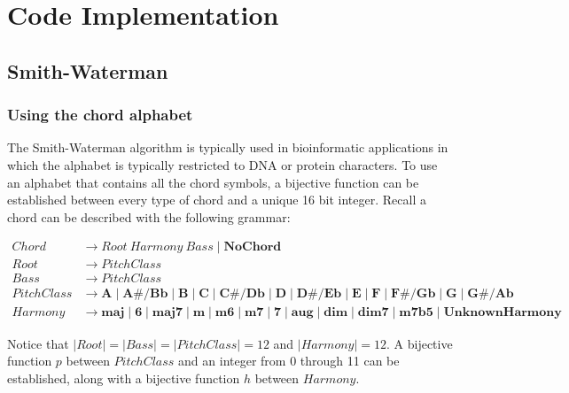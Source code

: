 \chapter{Code Implementation}

\section{Smith-Waterman}

\subsection{Using the chord alphabet}

The Smith-Waterman algorithm is typically used in bioinformatic applications in which the alphabet is typically restricted to DNA or protein characters. To use an alphabet that contains all the chord symbols, a bijective function can be established between every type of chord and a unique 16 bit integer. Recall a chord can be described with the following grammar:

\begin{align*}
Chord &\to Root\ Harmony \ Bass \mid \textbf{NoChord} \\
Root &\to PitchClass \\
Bass &\to PitchClass \\
PitchClass &\to \textbf{A} \mid \textbf{A#/Bb} \mid \textbf{B} \mid \textbf{C} \mid \textbf{C#/Db} \mid \textbf{D} \mid \textbf{D#/Eb} \mid \textbf{E} \mid \textbf{F} \mid \textbf{F#/Gb} \mid \textbf{G} \mid \textbf{G#/Ab} \\
Harmony &\to \textbf{maj} \mid \textbf{6} \mid \textbf{maj7} \mid \textbf{m} \mid \textbf{m6} \mid \textbf{m7} \mid \textbf{7} \mid \textbf{aug} \mid \textbf{dim} \mid \textbf{dim7} \mid \textbf{m7b5} \mid \textbf{UnknownHarmony}
\end{align*}

Notice that $|Root| = |Bass| = |PitchClass| = 12$ and $|Harmony| = 12$. A bijective function $p$ between $PitchClass$ and an integer from 0 through 11 can be established, along with a bijective function $h$ between $Harmony$.

